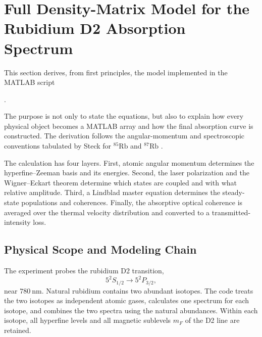 \section[Full Density-Matrix Model for the Rubidium D2 Absorption Spectrum]
{Full Density-Matrix Model for the\\Rubidium D2 Absorption Spectrum}
\label{sec:density_matrix_model}

This section derives, from first principles, the model implemented in the
MATLAB script
\begin{center}
.
\end{center}
The purpose is not only to state the equations, but also to explain how every
physical object becomes a MATLAB array and how the final absorption curve is
constructed.  The
derivation follows the angular-momentum and spectroscopic conventions tabulated
by Steck for \(^{85}\mathrm{Rb}\) and \(^{87}\mathrm{Rb}\)
\cite{Steck85,Steck87}.

\begin{idea}
The calculation has four layers.  First, atomic angular momentum determines
the hyperfine--Zeeman basis and its energies.  Second, the laser polarization
and the Wigner--Eckart theorem determine which states are coupled and with what
relative amplitude.  Third, a Lindblad master equation determines the
steady-state populations and coherences.  Finally, the absorptive optical
coherence is averaged over the thermal velocity distribution and converted to
a transmitted-intensity loss.
\end{idea}

\subsection{Physical Scope and Modeling Chain}
\label{subsec:dm_scope}

The experiment probes the rubidium D2 transition,
\begin{equation}
5^{2}S_{1/2}\longrightarrow 5^{2}P_{3/2},
\end{equation}
near \(780~\mathrm{nm}\).  Natural rubidium contains two abundant isotopes.
The code treats the two isotopes as independent atomic gases, calculates one
spectrum for each isotope, and combines the two spectra using the natural
abundances.  Within each isotope, all hyperfine levels and all magnetic
sublevels \(m_F\) of the D2 line are retained.

